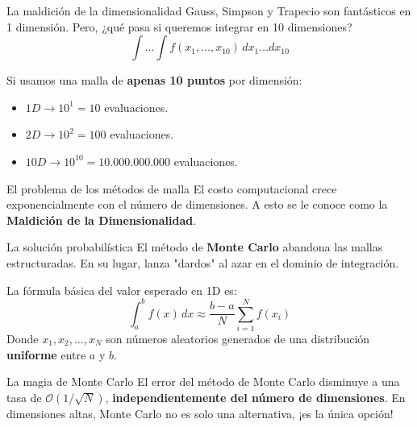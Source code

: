 \documentclass[aspectratio=169,10pt]{beamer}
\begin{document}
	\begin{frame}{La maldición de la dimensionalidad}
		\vspace{6pt}
		Gauss, Simpson y Trapecio son fantásticos en 1 dimensión. 
		Pero, ¿qué pasa si queremos integrar en 10 dimensiones?
		\[ \int \dots \int f(x_1, \dots, x_{10}) \, dx_1 \dots dx_{10} \]
		
		\vspace{6pt}
		Si usamos una malla de \textbf{apenas 10 puntos} por dimensión:
		\begin{itemize}
			\item $1D \rightarrow 10^1 = 10$ evaluaciones.
			\item $2D \rightarrow 10^2 = 100$ evaluaciones.
			\item $10D \rightarrow 10^{10} = 10.000.000.000$ evaluaciones.
		\end{itemize}
		
		\vspace{10pt}
		\begin{defbox}{El problema de los métodos de malla}
			El costo computacional crece exponencialmente con el número de dimensiones. A esto se le conoce como la \textbf{Maldición de la Dimensionalidad}.
		\end{defbox}
	\end{frame}
	
	\begin{frame}{La solución probabilística}
		\vspace{6pt}
		El método de \textbf{Monte Carlo} abandona las mallas estructuradas. En su lugar, lanza "dardos" al azar en el dominio de integración.
		
		\vspace{8pt}
		La fórmula básica del valor esperado en 1D es:
		\[ \int_{a}^{b} f(x) \, dx \approx \frac{b-a}{N} \sum_{i=1}^{N} f(x_i) \]
		Donde $x_1, x_2, \dots, x_N$ son números aleatorios generados de una distribución \textbf{uniforme} entre $a$ y $b$.
		
		\vspace{10pt}
		\begin{resultbox}{La magia de Monte Carlo}
			El error del método de Monte Carlo disminuye a una tasa de $\mathcal{O}(1/\sqrt{N})$, \textbf{independientemente del número de dimensiones}. En dimensiones altas, Monte Carlo no es solo una alternativa, ¡es la única opción!
		\end{resultbox}
	\end{frame}
	
\end{document}
